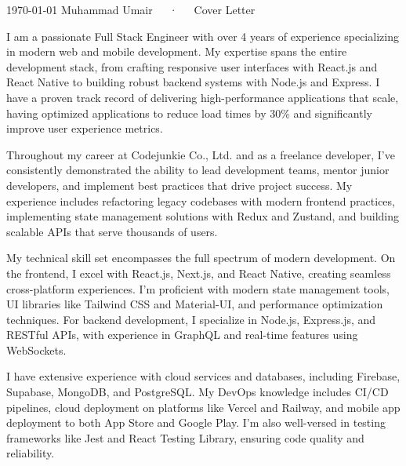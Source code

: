 \documentclass[11pt, a4paper]{awesome-cv}
\begin{document}
\makecvheader[R]

\makecvfooter
  {\today}
  {Muhammad Umair~~~·~~~Cover Letter}
  {}

\makelettertitle

\begin{cvletter}

I am a passionate Full Stack Engineer with over 4 years of experience specializing in modern web and mobile development. My expertise spans the entire development stack, from crafting responsive user interfaces with React.js and React Native to building robust backend systems with Node.js and Express. I have a proven track record of delivering high-performance applications that scale, having optimized applications to reduce load times by 30\% and significantly improve user experience metrics.

Throughout my career at Codejunkie Co., Ltd. and as a freelance developer, I've consistently demonstrated the ability to lead development teams, mentor junior developers, and implement best practices that drive project success. My experience includes refactoring legacy codebases with modern frontend practices, implementing state management solutions with Redux and Zustand, and building scalable APIs that serve thousands of users.

My technical skill set encompasses the full spectrum of modern development. On the frontend, I excel with React.js, Next.js, and React Native, creating seamless cross-platform experiences. I'm proficient with modern state management tools, UI libraries like Tailwind CSS and Material-UI, and performance optimization techniques. For backend development, I specialize in Node.js, Express.js, and RESTful APIs, with experience in GraphQL and real-time features using WebSockets.

I have extensive experience with cloud services and databases, including Firebase, Supabase, MongoDB, and PostgreSQL. My DevOps knowledge includes CI/CD pipelines, cloud deployment on platforms like Vercel and Railway, and mobile app deployment to both App Store and Google Play. I'm also well-versed in testing frameworks like Jest and React Testing Library, ensuring code quality and reliability.


\end{cvletter}
\end{document}
